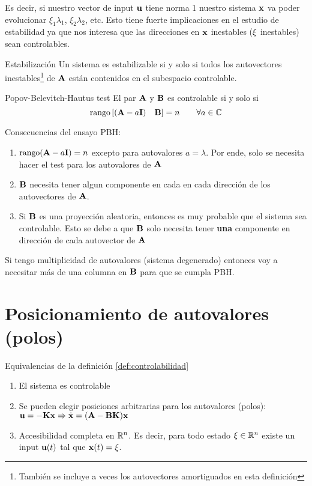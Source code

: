 \documentclass[11pt, a4paper, twoside, openright, openany]{book}
\newcommand{\dimss}{\dimfont{n}}
\begin{document}
Es decir, si nuestro vector de input $\mathbf{u}$ tiene norma 1 nuestro sistema $\mathbf{x}$ va poder evolucionar $\xi_1\lambda_1$, $\xi_2\lambda_2$, etc. Esto tiene fuerte implicaciones en el estudio de estabilidad ya que nos interesa que las direcciones en $\mathbf{x}$ inestables ($\mathbf{\xi}$ inestables) sean controlables.

\begin{definition}{Estabilización}
	Un sistema es estabilizable si y solo si todos los autovectores inestables\footnote{También se incluye a veces los autovectores amortiguados en esta definición} de $\mathbf{A}$ están contenidos en el subespacio controlable.
\end{definition}


\begin{definition}{Popov-Belevitch-Hautus test}
El par $\mathbf{A}$ y $\mathbf{B}$ es controlable si y solo si 
\[
\operatorname{rango}\left[(\MA - a\eye)\quad \MB \right] = \dimss  \qquad \forall a \in \mathbb{C}
\]

\end{definition}

Consecuencias del ensayo PBH:
\begin{enumerate}
	\item \(\operatorname{rango}(\mathbf{A} - a\mathbf{I})=n\) excepto para autovalores $a=\lambda$. Por ende, solo se necesita hacer el test para los autovalores de $\mathbf{A}$
	\item $\mathbf{B}$ necesita  tener algun componente en cada en cada dirección de los autovectores de $\mathbf{A}$.
	\item  Si $\mathbf{B}$ es una proyección aleatoria, entonces es muy probable que el sistema sea controlable. Esto se debe a que $\mathbf{B}$ solo necesita tener \textbf{una} componente en dirección de cada autovector de $\mathbf{A}$
\end{enumerate}


Si tengo multiplicidad de autovalores (sistema degenerado) entonces voy a necesitar más de una columna en $\mathbf{B}$ para que se cumpla PBH. 

\section{Posicionamiento de autovalores (polos)}

Equivalencias de la definición \ref{def:controlabilidad}
\begin{enumerate}
	\item El sistema es controlable
	\item Se pueden elegir posiciones arbitrarias para los autovalores (polos): $\mathbf{u} =-\mathbf{K}\mathbf{x} \Rightarrow \dot{\mathbf{x}} =(\mathbf{A} - \mathbf{B} \mathbf{K})\mathbf{x}$
	\item Accesibilidad completa en $\mathbb{R}^{\dimss}$. Es decir, para todo estado $\xi\in\mathbb{R}^\dimss$ existe un input $\mathbf{u}(t)$ tal que $\mathbf{x}(t)=\xi$.
\end{enumerate}
\end{document}
